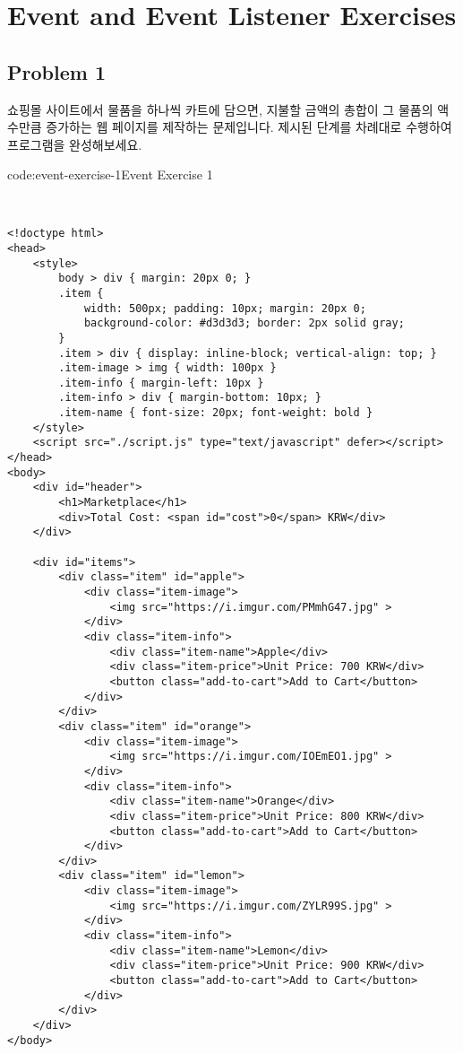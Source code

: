 \section{Event and Event Listener Exercises}\label{sect:event-and-event-listener-exercises}

\subsection*{Problem 1}

쇼핑몰 사이트에서 물품을 하나씩 카트에 담으면, 지불할 금액의 총합이 그 물품의 액수만큼 증가하는 웹 페이지를 제작하는 문제입니다. 제시된 단계를 차례대로 수행하여 프로그램을 완성해보세요.

\begin{codeenv}{code:event-exercise-1}{Event Exercise 1}\begin{verbatim}


<!doctype html>
<head>
    <style>
        body > div { margin: 20px 0; }
        .item { 
            width: 500px; padding: 10px; margin: 20px 0; 
            background-color: #d3d3d3; border: 2px solid gray;
        }
        .item > div { display: inline-block; vertical-align: top; }
        .item-image > img { width: 100px }
        .item-info { margin-left: 10px }
        .item-info > div { margin-bottom: 10px; }
        .item-name { font-size: 20px; font-weight: bold }
    </style>
    <script src="./script.js" type="text/javascript" defer></script>
</head>
<body>
    <div id="header">
        <h1>Marketplace</h1>
        <div>Total Cost: <span id="cost">0</span> KRW</div>
    </div>

    <div id="items">
        <div class="item" id="apple">
            <div class="item-image">
                <img src="https://i.imgur.com/PMmhG47.jpg" >
            </div>
            <div class="item-info">
                <div class="item-name">Apple</div>
                <div class="item-price">Unit Price: 700 KRW</div>
                <button class="add-to-cart">Add to Cart</button>
            </div>
        </div>
        <div class="item" id="orange">
            <div class="item-image">
                <img src="https://i.imgur.com/IOEmEO1.jpg" >
            </div>
            <div class="item-info">
                <div class="item-name">Orange</div>
                <div class="item-price">Unit Price: 800 KRW</div>
                <button class="add-to-cart">Add to Cart</button>
            </div>
        </div>
        <div class="item" id="lemon">
            <div class="item-image">
                <img src="https://i.imgur.com/ZYLR99S.jpg" >
            </div>
            <div class="item-info">
                <div class="item-name">Lemon</div>
                <div class="item-price">Unit Price: 900 KRW</div>
                <button class="add-to-cart">Add to Cart</button>
            </div>
        </div>
    </div>
</body>
\end{verbatim}
\end{codeenv}

